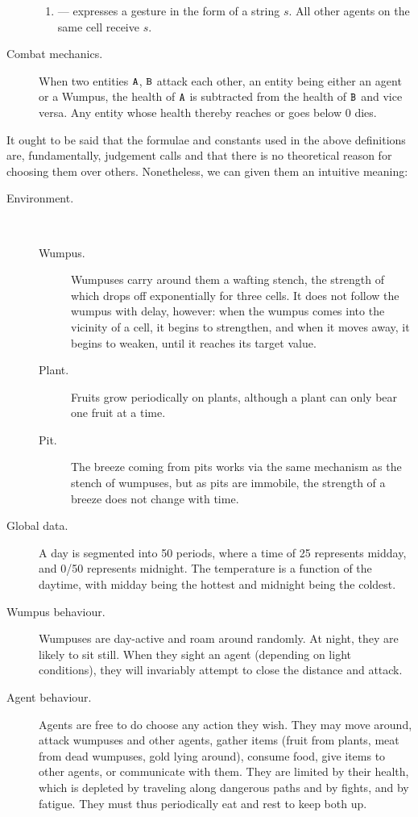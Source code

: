 \begin{definition}
\begin{description}
\begin{enumerate}
		\item[\action{gesture}] --- expresses a gesture in the form of a string $s$. All other agents on the same cell receive $s$.
	\end{enumerate}
	
	\item[Combat mechanics.] When two entities $\mathtt{A}$, $\mathtt{B}$ attack each other, an entity being either an agent or a Wumpus, the health of $\mathtt{A}$ is subtracted from the health of $\mathtt{B}$ and vice versa. Any entity whose health thereby reaches or goes below 0 dies.
	
\end{description}
\end{definition}

It ought to be said that the formulae and constants used in the above definitions are, fundamentally, judgement calls and that there is no theoretical reason for choosing them over others. Nonetheless, we can given them an intuitive meaning:
\begin{description}
	\item[Environment.]\ 
	\begin{description}
		\item[Wumpus.] Wumpuses carry around them a wafting stench, the strength of which drops off exponentially for three cells. It does not follow the wumpus with delay, however: when the wumpus comes into the vicinity of a cell, it begins to strengthen, and when it moves away, it begins to weaken, until it reaches its target value.
		\item[Plant.] Fruits grow periodically on plants, although a plant can only bear one fruit at a time.
		\item[Pit.] The breeze coming from pits works via the same mechanism as the stench of wumpuses, but as pits are immobile, the strength of a breeze does not change with time.
	\end{description}
	\item[Global data.] A day is segmented into 50 periods, where a time of 25 represents midday, and 0/50 represents midnight. The temperature is a function of the daytime, with midday being the hottest and midnight being the coldest.
	\item[Wumpus behaviour.] Wumpuses are day-active and roam around randomly. At night, they are likely to sit still. When they sight an agent (depending on light conditions), they will invariably attempt to close the distance and attack.
	\item[Agent behaviour.] Agents are free to do choose any action they wish. They may move around, attack wumpuses and other agents, gather items (fruit from plants, meat from dead wumpuses, gold lying around), consume food, give items to other agents, or communicate with them. They are limited by their health, which is depleted by traveling along dangerous paths and by fights, and by fatigue. They must thus periodically eat and rest to keep both up. 
\end{description}

